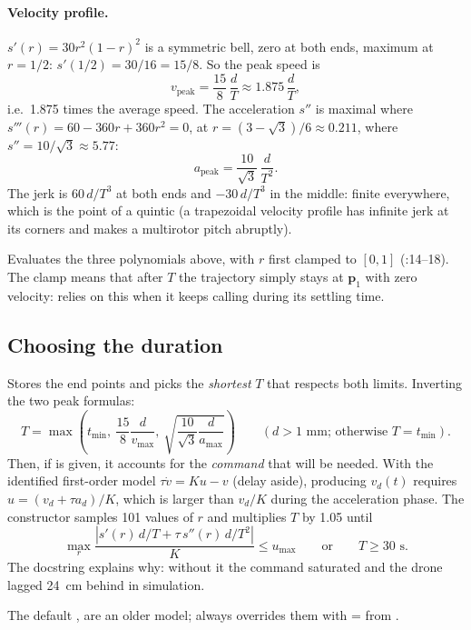 \paragraph{Velocity profile.} $s'(r) = 30r^2(1-r)^2$ is a symmetric bell, zero at both ends, maximum at $r=1/2$:
$s'(1/2) = 30/16 = 15/8$. So the peak speed is
$$ v_{\text{peak}} = \frac{15}{8}\,\frac{d}{T} \approx 1.875\,\frac{d}{T}, $$
i.e.\ 1.875 times the average speed. The acceleration $s''$ is maximal where $s'''(r) = 60-360r+360r^2 = 0$, at
$r = (3-\sqrt3)/6 \approx 0.211$, where $s'' = 10/\sqrt3 \approx 5.77$:
$$ a_{\text{peak}} = \frac{10}{\sqrt3}\,\frac{d}{T^2}. $$
The jerk is $60\,d/T^3$ at both ends and $-30\,d/T^3$ in the middle: finite everywhere, which is the point of a
quintic (a trapezoidal velocity profile has infinite jerk at its corners and makes a multirotor pitch abruptly).

Evaluates the three polynomials above, with $r$ first clamped to $[0,1]$ (:14--18). The
clamp means that after $T$ the trajectory simply stays at $\mathbf p_1$ with zero velocity: 
relies on this when it keeps calling  during its settling time.

\subsection{Choosing the duration}

Stores the end points and picks the \emph{shortest} $T$ that respects both limits. Inverting the two peak
formulas:
$$
T = \max\left( t_{\min},\ \frac{15}{8}\frac{d}{v_{\max}},\ \sqrt{\frac{10}{\sqrt3}\frac{d}{a_{\max}}} \right)
\qquad (d > 1\text{ mm; otherwise } T = t_{\min}).
$$
Then, if  is given, it accounts for the \emph{command} that will be needed. With the identified
first-order model $\tau \dot v = K u - v$ (delay aside), producing $v_d(t)$ requires
$u = (v_d + \tau a_d)/K$, which is larger than $v_d/K$ during the acceleration phase. The constructor samples
101 values of $r$ and multiplies $T$ by 1.05 until
$$
\max_r \frac{\left| s'(r)\,d/T + \tau\, s''(r)\, d/T^2 \right|}{K} \le u_{\max}
\qquad\text{or}\qquad T \ge 30\text{ s}.
$$
The docstring explains why: without it the command saturated and the drone lagged 24~cm behind in simulation.

The default ,  are an older model;  always overrides them with
 =  from .

